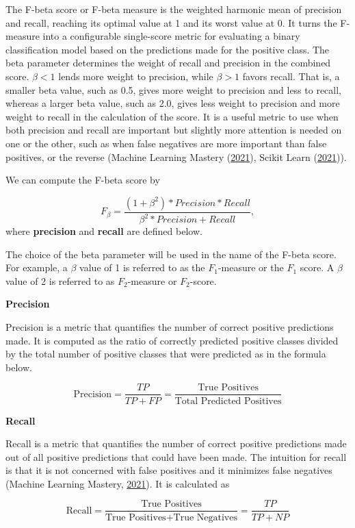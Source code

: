 \documentclass[
  10pt,
]{article}
\begin{document}
The F-beta score or F-beta measure is the weighted harmonic mean of precision and recall, reaching its optimal value at 1 and its worst value at 0. It turns the F-measure into a configurable single-score metric for evaluating a binary classification model based on the predictions made for the positive class. The beta parameter determines the weight of recall and precision in the combined score. \(\beta < 1\) lends more weight to precision, while \(\beta > 1\) favors recall. That is, a smaller beta value, such as 0.5, gives more weight to precision and less to recall, whereas a larger beta value, such as 2.0, gives less weight to precision and more weight to recall in the calculation of the score. It is a useful metric to use when both precision and recall are important but slightly more attention is needed on one or the other, such as when false negatives are more important than false positives, or the reverse (Machine Learning Mastery (\protect\hyperlink{ref-MLM}{2021}), Scikit Learn (\protect\hyperlink{ref-scikit_learn}{2021})).

We can compute the F-beta score by

\[
  F_\beta = \frac{(1 + \beta^2) * Precision * Recall}{\beta^2 * Precision + Recall},
\]
where \textbf{precision} and \textbf{recall} are defined below.

The choice of the beta parameter will be used in the name of the F-beta score. For example, a \(\beta\) value of 1 is referred to as the \(F_1\)-measure or the \(F_1\) score. A \(\beta\) value of 2 is referred to as \(F_2\)-measure or \(F_2\)-score.

\textbf{Precision}

Precision is a metric that quantifies the number of correct positive predictions made. It is computed as the ratio of correctly predicted positive classes divided by the total number of positive classes that were predicted as in the formula below.

\[
\text{Precision} = \frac{TP}{TP + FP} = \frac{\text{True Positives}}{\text{Total Predicted Positives}}
\]

\textbf{Recall}

Recall is a metric that quantifies the number of correct positive predictions made out of all positive predictions that could have been made. The intuition for recall is that it is not concerned with false positives and it minimizes false negatives (Machine Learning Mastery, \protect\hyperlink{ref-MLM}{2021}). It is calculated as

\[
\text{Recall} = \frac{\text{True Positives}}{\text{True Positives} + \text{True Negatives}} = \frac{TP}{TP + NP}
\]
\end{document}
